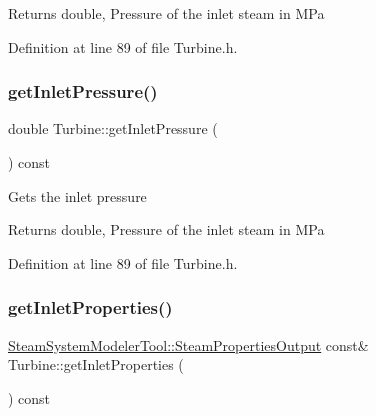 \begin{DoxyReturn}{Returns}
double, Pressure of the inlet steam in M\+Pa 
\end{DoxyReturn}


Definition at line 89 of file Turbine.\+h.

\mbox{\label{class_turbine_a148ad3877851f1c3931d8a6771d750c5}} 
\subsubsection{\texorpdfstring{get\+Inlet\+Pressure()}{getInletPressure()}\hspace{0.1cm}{\footnotesize\ttfamily [3/3]}}
{\footnotesize\ttfamily double Turbine\+::get\+Inlet\+Pressure (\begin{DoxyParamCaption}{ }\end{DoxyParamCaption}) const\hspace{0.3cm}{\ttfamily [inline]}}

Gets the inlet pressure

\begin{DoxyReturn}{Returns}
double, Pressure of the inlet steam in M\+Pa 
\end{DoxyReturn}


Definition at line 89 of file Turbine.\+h.

\mbox{\label{class_turbine_a7a906cf74affed9acfa4045964eccbf6}} 
\subsubsection{\texorpdfstring{get\+Inlet\+Properties()}{getInletProperties()}\hspace{0.1cm}{\footnotesize\ttfamily [1/3]}}
{\footnotesize\ttfamily \hyperlink{struct_steam_system_modeler_tool_1_1_steam_properties_output}{Steam\+System\+Modeler\+Tool\+::\+Steam\+Properties\+Output} const\& Turbine\+::get\+Inlet\+Properties (\begin{DoxyParamCaption}{ }\end{DoxyParamCaption}) const\hspace{0.3cm}{\ttfamily [inline]}}

